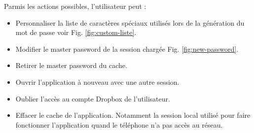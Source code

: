 \begin{center}
	\begin{minipage}{.3\textwidth}
	\end{minipage}
	\begin{minipage}{.3\textwidth}
	\end{minipage}
	\begin{minipage}{.3\textwidth}
	\end{minipage}        
\end{center}

Parmis les actions possibles, l'utilisateur peut :
\begin{itemize}
	\item Personnaliser la liste de caractères spéciaux utilisés lors de la génération du mot de passe voir Fig. \ref{fig:custom-liste}.
	\item Modifier le master password de la session chargée  Fig. \ref{fig:new-password}.
	\item Retirer le master password du cache.
	\item Ouvrir l'application à nouveau avec une autre session.
	\item Oublier l'accès au compte Dropbox de l'utilisateur.
	\item Effacer le cache de l'application. Notamment la session local utilisé pour faire fonctionner l'application quand le téléphone n'a pas accès au réseau.
\end{itemize}


